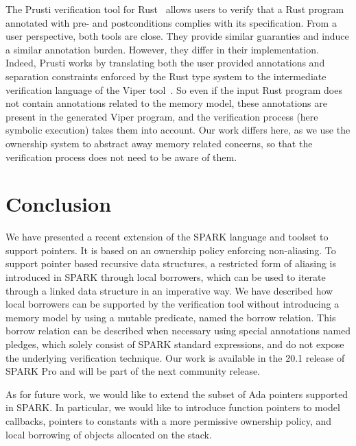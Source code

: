 \documentclass[runningheads]{llncs}
\begin{document}
The Prusti verification tool for Rust~\cite{astrauskas2019leveraging} allows users to verify that a Rust program annotated with pre- and postconditions complies with its specification. From a user perspective, both tools are close. They provide similar guaranties and induce a similar annotation burden. However, they differ in their implementation. Indeed, Prusti works by translating both the user provided annotations and separation constraints enforced by the Rust type system to the intermediate verification language of the Viper tool~\cite{muller2016viper}. %
So even if the input Rust program does not contain annotations related to the memory model, these annotations are present in the generated Viper program, and the verification process (here symbolic execution) takes them into account. Our work differs here, as we use the ownership system to abstract away memory related concerns, so that the verification process does not need to be aware of them. 

\section{Conclusion}
We have presented a recent extension of the SPARK language and toolset to support pointers. It is based on an ownership policy enforcing non-aliasing. To support pointer based recursive data structures, a restricted form of aliasing is introduced in SPARK through local borrowers, which can be used to iterate through a linked data structure in an imperative way. We have described how local borrowers can be supported by the verification tool without introducing a memory model by using a mutable predicate, named the borrow relation. This borrow relation can be described when necessary using special annotations named pledges, which solely consist of SPARK standard expressions, and do not expose the underlying verification technique. Our work is available in the 20.1 release of SPARK Pro and will be part of the next community release.

As for future work, we would like to extend the subset of Ada pointers supported in SPARK. In particular, we would like to introduce function pointers to model callbacks, pointers to constants with a more permissive ownership policy, and local borrowing of objects allocated on the stack.
\end{document}
